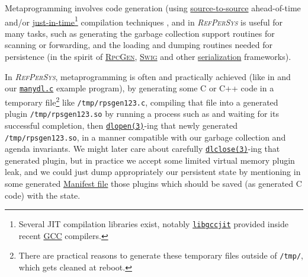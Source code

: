 \documentclass[11pt,a4paper,svgnames]{article}
\newcommand{\RefPerSys}{{\textit{\textsc{RefPerSys}}}}
\begin{document}
Metaprogramming involves code generation (using
\href{https://en.wikipedia.org/wiki/Source-to-source_compiler}{source-to-source}
ahead-of-time and/or
\href{https://en.wikipedia.org/wiki/Just-in-time_compilation}{just-in-time}\footnote{Several
JIT compilation libraries exist, notably
\href{https://gcc.gnu.org/onlinedocs/jit/}{\texttt{libgccjit}}
provided inside recent \href{http://gcc.gnu.org}{\textsc{GCC}}
compilers.} compilation techniques \cite{Aho:2006:dragon-book}, and in
     {\RefPerSys} is useful for many tasks, such as generating the
     garbage collection support routines for scanning or forwarding,
     and the loading and dumping routines needed for persistence (in
     the spirit of
     \href{https://en.wikipedia.org/wiki/RPCGEN}{\textsc{RpcGen}},
     \href{http://swig.org/}{\textsc{Swig}} and other
     \href{https://en.wikipedia.org/wiki/Serialization}{serialization}
     frameworks).

 In \RefPerSys, metaprogramming is often and practically achieved
 (like in \cite{Starynkevitch-DSL2011,
   Starynkevitch:2019:bismon-draft, Pitrat:1996:FGCS,
   Pitrat:2009:ArtifBeings} and our
 \href{https://github.com/bstarynk/misc-basile/blob/master/manydl.c}{\texttt{manydl.c}}
 example program), by generating some C or C++ code in a temporary
 file\footnote{There are practical reasons to generate these temporary
 files outside of \texttt{/tmp/}, which gets cleaned at reboot.} like
 \texttt{/tmp/rpsgen123.c}, compiling that file
 \cite{drepper:2011:write-shared-lib} into a generated plugin
 \texttt{/tmp/rpsgen123.so} by running a process such as
        {} and waiting for its successful
        completion, then
        \href{http://man7.org/linux/man-pages/man3/dlopen.3.html}{\texttt{dlopen(3)}}-ing
        that newly generated \texttt{/tmp/rpsgen123.so}, in a manner
        compatible with our garbage collection and agenda
        invariants. We might later care about carefully
        \href{http://man7.org/linux/man-pages/man3/dlclose.3.html}{\texttt{dlclose(3)}}-ing
        that generated plugin, but in practice we accept some limited
        virtual memory plugin leak, and we could just dump
        appropriately our persistent state by mentioning in some
        generated
        \href{https://en.wikipedia.org/wiki/Manifest_file}{Manifest
          file} those plugins which should be saved (as generated C
        code) with the state.
 
\end{document}
